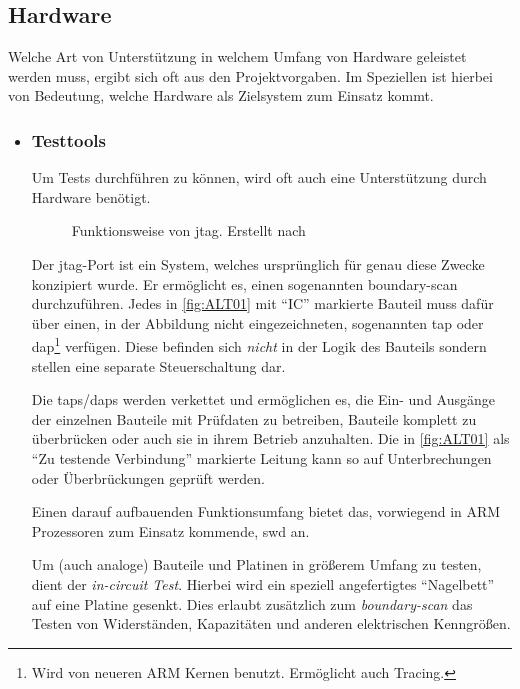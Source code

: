 \subsection{Hardware}\label{sub:hardware}
Welche Art von Unterstützung in welchem Umfang von Hardware geleistet werden
muss, ergibt sich oft aus den Projektvorgaben. Im Speziellen ist hierbei von
Bedeutung, welche Hardware als Zielsystem zum Einsatz kommt.
\begin{itemize}
  \item \subsubsection*{Testtools} Um Tests durchführen zu können, wird
  oft auch eine Unterstützung durch Hardware benötigt. 
  \begin{figure}[!h]
    \centering
    \def\svgwidth{\columnwidth}
    
    \caption{Funktionsweise von \gls{jtag}. Erstellt nach \cite{ALT01}}
    \label{fig:ALT01}
  \end{figure}
  Der \gls{jtag}-Port ist ein System, welches ursprünglich für genau diese
  Zwecke konzipiert wurde. Er ermöglicht es, einen sogenannten boundary-scan
  durchzuführen. Jedes in \autoref{fig:ALT01} mit "`IC"' markierte Bauteil muss
  dafür über einen, in der Abbildung nicht eingezeichneten, sogenannten \gls{tap} oder
  \gls{dap}\footnote{Wird von neueren ARM Kernen benutzt.
  Ermöglicht auch Tracing.} verfügen. Diese befinden sich \emph{nicht} in der
  Logik des Bauteils sondern stellen eine separate Steuerschaltung dar.
  
  Die \glspl{tap}/\glspl{dap} werden verkettet und ermöglichen es, die Ein-
  und Ausgänge der einzelnen Bauteile mit Prüfdaten zu betreiben, Bauteile komplett
  zu überbrücken oder auch sie in ihrem Betrieb anzuhalten.
  Die in \autoref{fig:ALT01} als "`Zu testende Verbindung"' markierte Leitung
  kann so auf Unterbrechungen oder Überbrückungen geprüft werden.
  
  Einen darauf aufbauenden Funktionsumfang bietet das, vorwiegend in ARM
  Prozessoren zum Einsatz kommende, \gls{swd} an.
  
  Um (auch analoge) Bauteile und Platinen in größerem Umfang zu testen, dient
  der \emph{in-circuit Test}. Hierbei wird ein speziell angefertigtes
  "`Nagelbett"' auf eine Platine gesenkt. Dies erlaubt zusätzlich zum
  \emph{boundary-scan} das Testen von Widerständen, Kapazitäten und anderen
  elektrischen Kenngrößen.
   

\end{itemize}
